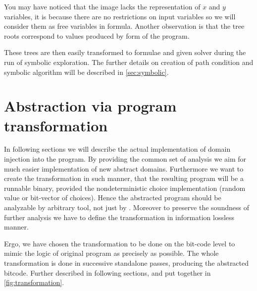You may have noticed that the image lacks the representation of $x$ and $y$
variables, it is because there are no restrictions on input variables so we will
consider them as free variables in formula. Another observation is that the tree
roots correspond to values produced by \SSA form of the program.

These trees are then easily transformed to formulae and given \SMT solver during
the run of symbolic exploration. The further details on creation of path
condition and symbolic algorithm will be described in \autoref{sec:symbolic}.

\section{Abstraction via program transformation}

In following sections we will describe the actual implementation of domain
injection into the program. By providing the common set of analysis we aim for
much easier implementation of new abstract domains. Furthermore we want to
create the transformation in such manner, that the resulting program will be a
runnable binary, provided the nondeterministic choice implementation (random
value or bit-vector of choices). Hence the abstracted program should be
analyzable by arbitrary tool, not just by \DIVINE. Moreover to preserve
the soundness of further analysis we have to define the transformation in
information lossless manner.

Ergo, we have chosen the transformation to be done on the \LLVM bit-code level to
mimic the logic of original program as precisely as possible. The whole
transformation is done in successive standalone \LLVM passes, producing the
abstracted \LLVM bitcode. Further described in following sections, and put
together in \autoref{fig:transformation}.

